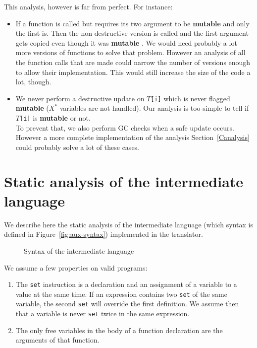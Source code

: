 \documentclass[12pt,a4paper]{article}
\newcommand{\cl}[1]{\texttt{#1}}
\newcommand{\bang}{\textbf{mutable }}
\begin{document}
This analysis, however is far from perfect. For instance:
\begin{itemize}
\item If a function is called but requires its two argument to be \bang and only the first is. Then the non-destructive version is called and the first argument gets copied even though it was \bang.
We would need probably a lot more versions of functions to solve that problem. However an analysis of all the function calls that are made could narrow the number of versions enough to allow their implementation. This would still increase the size of the code a lot, though.

\item We never perform a destructive update on \cl{$T$[i]} which is never flagged \bang ($X^*$ variables are not handled). Our analysis is too simple to tell if \cl{$T$[i]} is \bang or not.\\

To prevent that, we also perform GC checks when a safe update occurs. However a more complete implementation of the analysis Section~\ref{Canalysis} could probably solve a lot of these cases.
\end{itemize}


\newpage
\section{Static analysis of the intermediate language}
\label{sec:StaticAnal}

We describe here the static analysis of the intermediate language (which syntax is defined in Figure~\ref{fig:aux-syntax}) implemented in the translator.

\begin{figure}[!ht]

\caption{Syntax of the intermediate language}
\end{figure}

We assume a few properties on valid programs:
\begin{enumerate}
\item The \cl{set} instruction is a declaration and an assignment of a variable to a value at the same time. If an expression contains two \cl{set} of the same variable, the second \cl{set} will override the first definition. We assume then that a variable is never \cl{set} twice in the same expression.
\item The only free variables in the body of a function declaration are the arguments of that function.
\end{enumerate}
\end{document}
